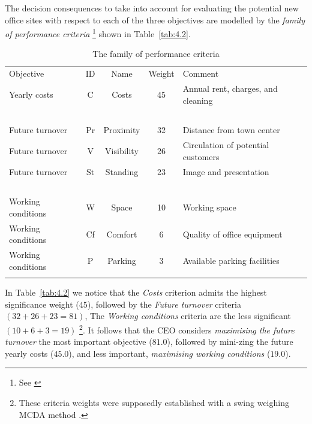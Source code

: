 The decision consequences to take into account for evaluating the potential new office sites with respect to each of the three objectives are modelled by the \emph{family of performance criteria} \footnote{See \citealp{ROY-2000}} shown in Table~\vref{tab:4.2}.
\begin{table}[ht]
\caption{The family of performance criteria}
\label{tab:4.2}       %
\begin{center}
    \begin{tabular}{l|c|c|c|l}
      \svhline\noalign{\smallskip}
      Objective & ID & Name & Weight & Comment\\
      \noalign{\smallskip}\hline\noalign{\smallskip}
    Yearly costs  &       C &   Costs &  45 &     Annual rent, charges, and cleaning\\
    \             &  \      & \        &  \ & \ \\
    Future turnover   &   Pr  & Proximity  & 32 & Distance from town center\\
    Future turnover   &   V  &  Visibility & 26 & Circulation of potential customers \\
    Future turnover   &   St &   Standing & 23 &   Image and presentation\\
    \                 &   \   & \          &  \ & \  \\
    Working conditions &  W  &  Space   &   10 &  Working space\\
    Working conditions &  Cf &  Comfort  &  6 &  Quality of office equipment\\
    Working conditions &  P  &  Parking  &  3 &  Available parking facilities\\
      \noalign{\smallskip}\hline
    \end{tabular}   
  \end{center}
\end{table}

In Table~\vref{tab:4.2} we notice that the \emph{Costs} criterion admits the highest significance weight ($45$), followed by the \emph{Future turnover} criteria $(32 + 26 + 23 = 81)$, The \emph{Working conditions} criteria are the less significant $(10 + 6 + 3 = 19)$ \footnote{These criteria weights were supposedly established with a swing weighing MCDA method \citep{KEE-1976}.}. It follows that the CEO considers \emph{maximising the future turnover} the most important objective ($81.0$), followed by mini-zing the future yearly costs ($45.0$), and less important, \emph{maximising working conditions} ($19.0$). 

